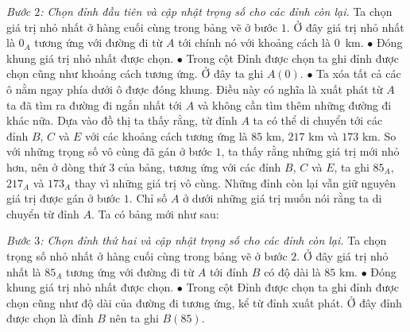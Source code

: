 \begin{multicols}{2}
\begin{table}[H]
		\vspace*{-10pt}
	\end{table}
	\textit{Bước $2$: Chọn đỉnh đầu tiên và cập nhật trọng số cho các đỉnh còn lại.}   
	Ta chọn giá trị nhỏ nhất ở hàng cuối cùng trong bảng vẽ ở bước $1$. Ở đây giá trị nhỏ nhất là $0_A$ tương ứng với đường đi từ $A$ tới chính nó với khoảng cách là $0$~km.
	\vskip 0.1cm
	$\bullet$ Đóng khung giá trị nhỏ nhất được chọn. 
	\vskip 0.1cm
	$\bullet$ Trong cột Đỉnh được chọn ta ghi đỉnh được chọn cũng như khoảng cách tương ứng. Ở đây ta ghi $A(0)$.
	\vskip 0.1cm
	$\bullet$ Ta xóa tất cả các ô nằm ngay phía dưới ô được đóng khung. Điều này có nghĩa là xuất phát từ $A$ ta đã tìm ra đường đi ngắn nhất tới $A$ và không cần tìm thêm những đường đi khác nữa.
	\vskip 0.1cm 
	Dựa vào đồ thị ta thấy rằng, từ đỉnh $A$ ta có thể di chuyển tới các đỉnh $B$, $C$ và $E$ với các khoảng cách tương ứng là $85$ km, $217$ km và $173$ km. So với những trọng số vô cùng đã gán ở bước $1$, ta thấy rằng những giá trị mới nhỏ hơn, nên ở dòng thứ $3$ của bảng, tương ứng với các đỉnh $B$, $C$ và $E$, ta ghi $85_A$, $217_A$ và $173_A$ thay vì những giá trị vô cùng. Những đỉnh còn lại vẫn giữ nguyên giá trị được gán ở bước $1$. Chỉ số $A$ ở dưới những giá trị muốn nói rằng ta di chuyển từ đỉnh $A$.
	\vskip 0.1cm 
	Ta có bảng mới như sau: 
	\begin{table}[H]
		\vspace*{-5pt}
		\centering
		\captionsetup{labelformat= empty, justification=centering}
		\vspace*{-10pt}
	\end{table}
	\textit{Bước $3$: Chọn đỉnh thứ hai và cập nhật trọng số cho các đỉnh còn lại.}  Ta chọn trọng số nhỏ nhất ở hàng cuối cùng trong bảng vẽ ở bước $2$. Ở đây giá trị nhỏ nhất là $85_A$ tương ứng với đường đi từ $A$ tới đỉnh $B$ có độ dài là  $85$ km.
	\vskip 0.1cm
	$\bullet$ Đóng khung giá trị nhỏ nhất được chọn. 
	\vskip 0.1cm
	$\bullet$ Trong cột Đỉnh được chọn ta ghi đỉnh được chọn cũng như độ dài của đường đi tương ứng, kể từ đỉnh xuất phát. Ở đây đỉnh được chọn là đỉnh $B$ nên ta ghi $B(85)$.

\end{multicols}
